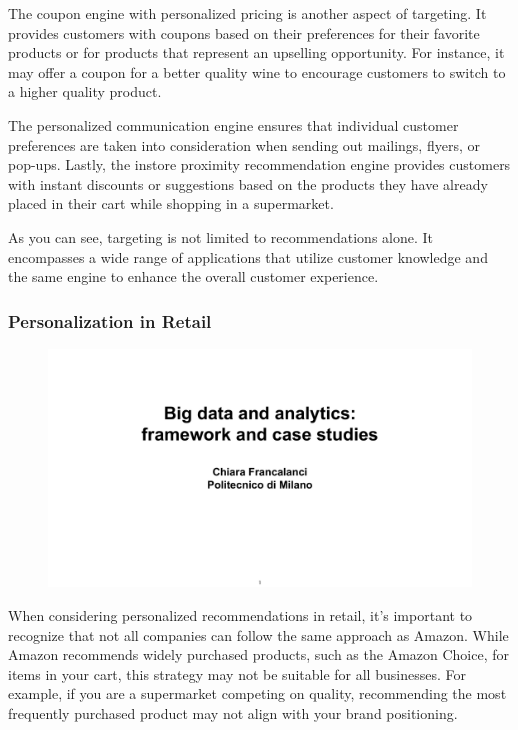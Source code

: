 The coupon engine with personalized pricing is another aspect of
targeting. It provides customers with coupons based on their preferences
for their favorite products or for products that represent an upselling
opportunity. For instance, it may offer a coupon for a better quality
wine to encourage customers to switch to a higher quality product.

The personalized communication engine ensures that individual customer
preferences are taken into consideration when sending out mailings,
flyers, or pop-ups. Lastly, the instore proximity recommendation engine
provides customers with instant discounts or suggestions based on the
products they have already placed in their cart while shopping in a
supermarket.

As you can see, targeting is not limited to recommendations alone. It
encompasses a wide range of applications that utilize customer knowledge
and the same engine to enhance the overall customer experience.

\subsubsection{Personalization in Retail}

\begin{figure}[!h]
  \centering
  \includegraphics[page=90, trim = 0cm 3cm 1.5cm 4.5cm, clip, width=\imagewidth]{images/06 - BIG_DATA.pdf}
\end{figure}

When considering personalized recommendations in retail, it's important
to recognize that not all companies can follow the same approach as
Amazon. While Amazon recommends widely purchased products, such as the
Amazon Choice, for items in your cart, this strategy may not be suitable
for all businesses. For example, if you are a supermarket competing on
quality, recommending the most frequently purchased product may not
align with your brand positioning.

